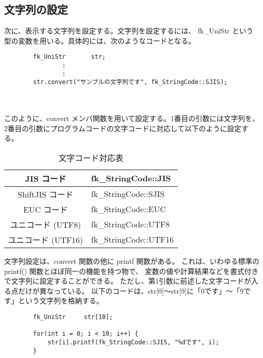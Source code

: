 \subsection{文字列の設定} \label{subsec:strDef}
次に、表示する文字列を設定する。文字列を設定するには、
fk\_UniStr という型の変数を用いる。具体的には、次のようなコードとなる。
\\
\begin{screen}
\begin{verbatim}
        fk_UniStr       str;
                :
                :
        str.convert("サンプルの文字列です", fk_StringCode::SJIS);
\end{verbatim}
\end{screen} ~ \\ ~ \\
このように、convert メンバ関数を用いて設定する。1番目の引数には文字列を、
2番目の引数にプログラムコードの文字コードに対応して以下のように設定する。
\begin{table}[H]
\caption{文字コード対応表}
\label{tbl:strCode}
\begin{center}
\begin{tabular}{|c|l|}
\hline
JIS コード & fk\_StringCode::JIS \\ \hline
ShiftJIS コード & fk\_StringCode::SJIS \\ \hline
EUC コード & fk\_StringCode::EUC \\ \hline
ユニコード (UTF8) & fk\_StringCode::UTF8 \\ \hline
ユニコード (UTF16) & fk\_StringCode::UTF16 \\ \hline
\end{tabular}
\end{center}
\end{table}

文字列設定は、convert 関数の他に printf 関数がある。
これは、いわゆる標準の printf() 関数とほぼ同一の機能を持つ物で、
変数の値や計算結果などを書式付きで文字列に設定することができる。
ただし、第1引数に前述した文字コードが入る点だけが異なっている。
以下のコードは、str[0]〜str[9]に「0です」〜「9です」という文字列を格納する。
\begin{screen}
\begin{verbatim}
        fk_UniStr     str[10];

        for(int i = 0; i < 10; i++) {
            str[i].printf(fk_StringCode::SJIS, "%dです", i);
        }
\end{verbatim}
\end{screen}

